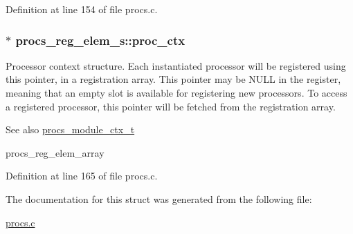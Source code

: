 Definition at line 154 of file procs.\+c.

\subsubsection[{\texorpdfstring{proc\+\_\+ctx}{proc_ctx}}]{$\ast$ procs\+\_\+reg\+\_\+elem\+\_\+s\+::proc\+\_\+ctx}\hypertarget{structprocs__reg__elem__s_aa394ff40393e8ca08c8f4c9b0c965698}{}\label{structprocs__reg__elem__s_aa394ff40393e8ca08c8f4c9b0c965698}
Processor context structure. Each instantiated processor will be registered using this pointer, in a registration array. This pointer may be N\+U\+LL in the register, meaning that an empty slot is available for registering new processors. To access a registered processor, this pointer will be fetched from the registration array. \begin{DoxySeeAlso}{See also}
\hyperlink{procs_8c_ad411ade07d8515e93bc2e7abf2b1e765}{procs\+\_\+module\+\_\+ctx\+\_\+t} 

procs\+\_\+reg\+\_\+elem\+\_\+array 
\end{DoxySeeAlso}


Definition at line 165 of file procs.\+c.



The documentation for this struct was generated from the following file\+:\begin{DoxyCompactItemize}
\item 
\hyperlink{procs_8c}{procs.\+c}\end{DoxyCompactItemize}
